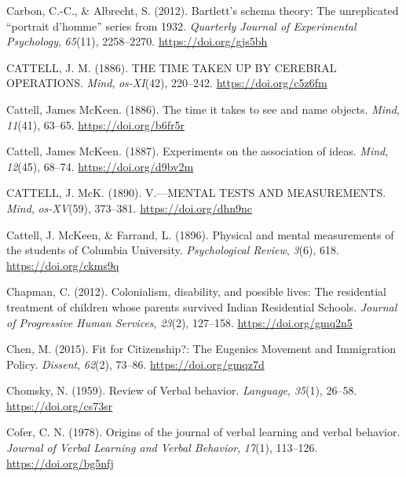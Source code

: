 \documentclass[
  oneside,
  12pt]{crumpbook}
\newlength{\cslhangindent}
\newlength{\cslentryspacingunit} %
\newenvironment{CSLReferences}[2] %
 {%
  \setlength{\parindent}{0pt}
  \ifodd #1
  \let\oldpar\par
  \def\par{\hangindent=\cslhangindent\oldpar}
  \fi
  \setlength{\parskip}{#2\cslentryspacingunit}
 }%
 {}
\begin{document}
\begin{CSLReferences}{1}{0}
\leavevmode{}%
Carbon, C.-C., \& Albrecht, S. (2012). Bartlett's schema theory: {The} unreplicated {``portrait d'homme''} series from 1932. \emph{Quarterly Journal of Experimental Psychology}, \emph{65}(11), 2258--2270. \url{https://doi.org/gjs5bh}

\leavevmode{}%
CATTELL, J. M. (1886). {THE TIME TAKEN UP BY CEREBRAL OPERATIONS}. \emph{Mind}, \emph{os-XI}(42), 220--242. \url{https://doi.org/c5z6fm}

\leavevmode{}%
Cattell, James McKeen. (1886). The time it takes to see and name objects. \emph{Mind}, \emph{11}(41), 63--65. \url{https://doi.org/b6fr5r}

\leavevmode{}%
Cattell, James McKeen. (1887). Experiments on the association of ideas. \emph{Mind}, \emph{12}(45), 68--74. \url{https://doi.org/d9bv2m}

\leavevmode{}%
CATTELL, J. McK. (1890). V.---{MENTAL TESTS AND MEASUREMENTS}. \emph{Mind}, \emph{os-XV}(59), 373--381. \url{https://doi.org/dhn9nc}

\leavevmode{}%
Cattell, J. McKeen, \& Farrand, L. (1896). Physical and mental measurements of the students of {Columbia University}. \emph{Psychological Review}, \emph{3}(6), 618. \url{https://doi.org/ckms9q}

\leavevmode{}%
Chapman, C. (2012). Colonialism, disability, and possible lives: {The} residential treatment of children whose parents survived {Indian Residential Schools}. \emph{Journal of Progressive Human Services}, \emph{23}(2), 127--158. \url{https://doi.org/gmq2n5}

\leavevmode{}%
Chen, M. (2015). Fit for {Citizenship}?: {The Eugenics Movement} and {Immigration Policy}. \emph{Dissent}, \emph{62}(2), 73--86. \url{https://doi.org/gmqz7d}

\leavevmode{}%
Chomsky, N. (1959). Review of {Verbal} behavior. \emph{Language}, \emph{35}(1), 26--58. \url{https://doi.org/cs73sr}

\leavevmode{}%
Cofer, C. N. (1978). Origins of the journal of verbal learning and verbal behavior. \emph{Journal of Verbal Learning and Verbal Behavior}, \emph{17}(1), 113--126. \url{https://doi.org/bg5nfj}


\end{CSLReferences}
\end{document}
